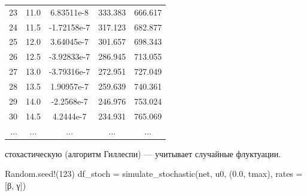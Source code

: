 \documentclass[
  12pt,
  a4paper,
  DIV=11,
  numbers=noendperiod]{scrreprt}
\newenvironment{Shaded}{\begin{snugshade}}{\end{snugshade}}
\newcommand{\BuiltInTok}[1]{\textcolor[rgb]{0.00,0.23,0.31}{#1}}
\newcommand{\FloatTok}[1]{\textcolor[rgb]{0.68,0.00,0.00}{#1}}
\newcommand{\FunctionTok}[1]{\textcolor[rgb]{0.28,0.35,0.67}{#1}}
\newcommand{\NormalTok}[1]{\textcolor[rgb]{0.00,0.23,0.31}{#1}}
\newcommand{\OperatorTok}[1]{\textcolor[rgb]{0.37,0.37,0.37}{#1}}
\begin{document}
\begin{tabular}{r|cccc}
    23 & 11.0 & 6.83511e-8 & 333.383 & 666.617 \\
    24 & 11.5 & -1.72158e-7 & 317.123 & 682.877 \\
    25 & 12.0 & 3.64045e-7 & 301.657 & 698.343 \\
    26 & 12.5 & -3.92833e-7 & 286.945 & 713.055 \\
    27 & 13.0 & -3.79316e-7 & 272.951 & 727.049 \\
    28 & 13.5 & 1.90957e-7 & 259.639 & 740.361 \\
    29 & 14.0 & -2.2568e-7 & 246.976 & 753.024 \\
    30 & 14.5 & 4.2444e-7 & 234.931 & 765.069 \\
    $\dots$ & $\dots$ & $\dots$ & $\dots$ & $\dots$ \\
\end{tabular}

стохастическую (алгоритм Гиллеспи) --- учитывает случайные флуктуации.

\begin{Shaded}
\begin{Highlighting}[]
\BuiltInTok{Random}\NormalTok{.}\FunctionTok{seed!}\NormalTok{(}\FloatTok{123}\NormalTok{)}
\NormalTok{df\_stoch }\OperatorTok{=} \FunctionTok{simulate\_stochastic}\NormalTok{(net, u0, (}\FloatTok{0.0}\NormalTok{, tmax), rates }\OperatorTok{=}\NormalTok{ [β, γ])}
\end{Highlighting}
\end{Shaded}
\end{document}
